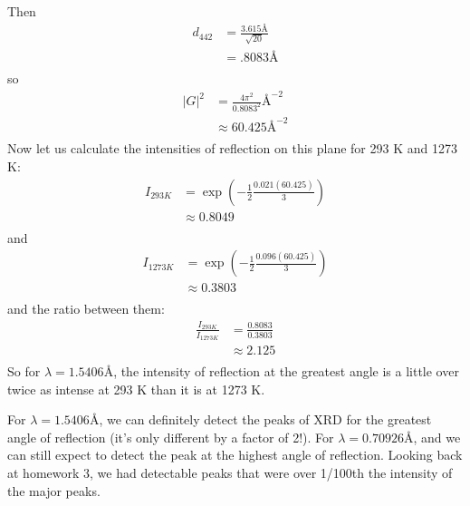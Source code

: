 \documentclass{article}
\begin{document}
Then 
\begin{align*}
    d_{442} &= \frac{3.615 \text{\AA}}{\sqrt{20}} \\
    &= .8083 \text{\AA} \\
\end{align*}
so
\begin{align*}
    |G|^2 &= \frac{4\pi^2}{0.8083^2} \text{\AA}^{-2} \\
    &\approx 60.425 \text{\AA}^{-2} \\
\end{align*}
Now let us calculate the intensities of reflection on this plane for 293 K and 1273 K:
\begin{align*}
    I_{293 K} &= \exp{\left(-\frac{1}{2}\frac{0.021(60.425)}{3}\right)} \\
    &\approx 0.8049 \\
\end{align*}
and
\begin{align*}
    I_{1273 K} &= \exp{\left(-\frac{1}{2}\frac{0.096(60.425)}{3}\right)} \\
    &\approx 0.3803 \\
\end{align*}
and the ratio between them:
\begin{align*}
    \frac{I_{293 K}}{I_{1273 K}} &= \frac{0.8083}{0.3803} \\
    &\approx 2.125 \\
\end{align*}
So for $\lambda = 1.5406 \text{\AA}$, the intensity of reflection at the greatest angle is a little over twice as intense at 293 K than it is at 1273 K.
\newline

For $\lambda = 1.5406 \text{\AA}$, we can definitely detect the peaks of XRD for the greatest angle of reflection (it's only different by a factor of 2!). For $\lambda = 0.70926 \text{\AA}$, and we can still expect to detect the peak at the highest angle of reflection. Looking back at homework 3, we had detectable peaks that were over 1/100th the intensity of the major peaks.
\end{document}
